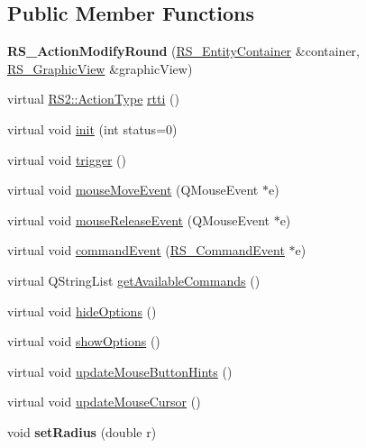\subsection*{Public Member Functions}
\begin{DoxyCompactItemize}
\item 
\hypertarget{classRS__ActionModifyRound_a0fea5941b9fee14e5804df13798dfac4}{{\bfseries R\-S\-\_\-\-Action\-Modify\-Round} (\hyperlink{classRS__EntityContainer}{R\-S\-\_\-\-Entity\-Container} \&container, \hyperlink{classRS__GraphicView}{R\-S\-\_\-\-Graphic\-View} \&graphic\-View)}\label{classRS__ActionModifyRound_a0fea5941b9fee14e5804df13798dfac4}

\item 
virtual \hyperlink{classRS2_afe3523e0bc41fd637b892321cfc4b9d7}{R\-S2\-::\-Action\-Type} \hyperlink{classRS__ActionModifyRound_aec40f0e625c4a3a58be2e81454fb1f12}{rtti} ()
\item 
virtual void \hyperlink{classRS__ActionModifyRound_a6a894b13c82ccfb28b7b8c57d1c5151e}{init} (int status=0)
\item 
virtual void \hyperlink{classRS__ActionModifyRound_aca1b9048129a2ec36c108252aef62e22}{trigger} ()
\item 
virtual void \hyperlink{classRS__ActionModifyRound_a1f76c03d59d7d1e443c4c0f2129a3360}{mouse\-Move\-Event} (Q\-Mouse\-Event $\ast$e)
\item 
virtual void \hyperlink{classRS__ActionModifyRound_a0972b87fc0f05f3d264086be1a18a31d}{mouse\-Release\-Event} (Q\-Mouse\-Event $\ast$e)
\item 
virtual void \hyperlink{classRS__ActionModifyRound_aa4eefb7ee9a92c7f4fe1ca8e96372fa0}{command\-Event} (\hyperlink{classRS__CommandEvent}{R\-S\-\_\-\-Command\-Event} $\ast$e)
\item 
virtual Q\-String\-List \hyperlink{classRS__ActionModifyRound_ac1511110a626c43987041150bfb68947}{get\-Available\-Commands} ()
\item 
virtual void \hyperlink{classRS__ActionModifyRound_a35a85c6cbb9498dd4c1736fc3647e0d6}{hide\-Options} ()
\item 
virtual void \hyperlink{classRS__ActionModifyRound_a8083b45e324b06d410514b9658f2db6f}{show\-Options} ()
\item 
virtual void \hyperlink{classRS__ActionModifyRound_a299ff30092fc064abff7403402ca0491}{update\-Mouse\-Button\-Hints} ()
\item 
virtual void \hyperlink{classRS__ActionModifyRound_a93dba1bd73f86e24388869c934756598}{update\-Mouse\-Cursor} ()
\item 
\hypertarget{classRS__ActionModifyRound_ac7b9ae18df683ad8097abe1a084ab633}{void {\bfseries set\-Radius} (double r)}\label{classRS__ActionModifyRound_ac7b9ae18df683ad8097abe1a084ab633}


\end{DoxyCompactItemize}
